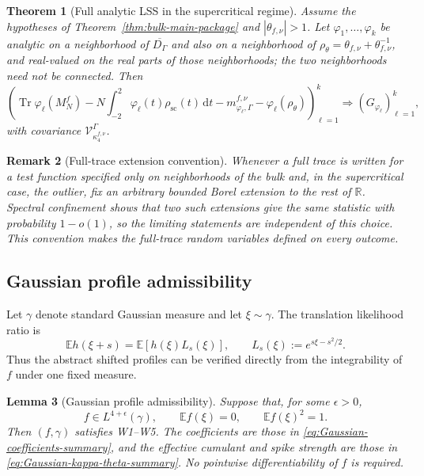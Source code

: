 \documentclass[10pt,a4paper]{amsart}
\newtheorem{theorem}{Theorem}[section]
\newtheorem{lemma}[theorem]{Lemma}
\newtheorem{remark}[theorem]{Remark}
\newcommand{\E}{\mathbb E}
\newcommand{\Tr}{\operatorname{Tr}}
\newcommand{\scal}{\mathrm{sc}}
\newcommand{\dd}{\mathrm d}
\begin{document}
\begin{theorem}[Full analytic LSS in the supercritical regime]
\label{thm:R6-supercritical-full}
Assume the hypotheses of Theorem~\ref{thm:bulk-main-package} and
$|\theta_{f,\nu}|>1$.  Let $\varphi_1,\ldots,\varphi_k$ be analytic on a
neighborhood of $\overline{D_\Gamma}$ and also on a neighborhood of
$\rho_\theta=\theta_{f,\nu}+\theta_{f,\nu}^{-1}$, and real-valued on the real
parts of those neighborhoods; the two neighborhoods need not be connected.
Then
\begin{equation}\label{eq:R6-full-CLT}
 \left(
 \Tr\varphi_\ell(M_N^f)
 -N\int_{-2}^2\varphi_\ell(t)\rho_{\scal}(t)\,\dd t
 -m_{\varphi_\ell,\Gamma}^{f,\nu}
 -\varphi_\ell(\rho_\theta)
 \right)_{\ell=1}^k
 \Longrightarrow (G_{\varphi_\ell})_{\ell=1}^k,
\end{equation}
with covariance $\mathcal V_{\kappa_4^{f,\nu}}^\Gamma$.
\end{theorem}

\begin{remark}[Full-trace extension convention]
Whenever a full trace is written for a test function specified only on
neighborhoods of the bulk and, in the supercritical case, the outlier, fix an
arbitrary bounded Borel extension to the rest of \(\mathbb R\).  Spectral
confinement shows that two such extensions give the same statistic with
probability \(1-o(1)\), so the limiting statements are independent of this
choice.  This convention makes the full-trace random variables defined on
every outcome.
\end{remark}

\subsection{Gaussian profile admissibility}
\label{subsec:gaussian-profile-main}

Let $\gamma$ denote standard Gaussian measure and let $\xi\sim\gamma$.  The
translation likelihood ratio is
\begin{equation}\label{eq:Gaussian-LR-main}
 \E h(\xi+s)
 =\E\!\left[h(\xi)L_s(\xi)\right],
 \qquad
 L_s(\xi):=e^{s\xi-s^2/2}.
\end{equation}
Thus the abstract shifted profiles can be verified directly from the
integrability of $f$ under one fixed measure.

\begin{lemma}[Gaussian profile admissibility]
\label{lem:gaussian-profile-main}
Suppose that, for some $\epsilon>0$,
\begin{equation}\label{eq:Gaussian-f-assumptions-main}
 f\in L^{4+\epsilon}(\gamma),
 \qquad
 \E f(\xi)=0,
 \qquad
 \E f(\xi)^2=1.
\end{equation}
Then $(f,\gamma)$ satisfies W1--W5.  The coefficients are those in
\eqref{eq:Gaussian-coefficients-summary}, and the effective cumulant and spike
strength are those in \eqref{eq:Gaussian-kappa-theta-summary}.  No pointwise
differentiability of $f$ is required.
\end{lemma}
\end{document}
